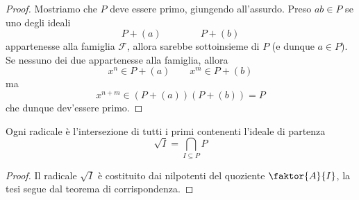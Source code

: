 \begin{multicols}{2}
\begin{proof}
	Mostriamo che $ P $ deve essere primo, giungendo all'assurdo. Preso $ ab \in P $ se uno degli ideali 
	\[ P + (a) \qquad \qquad P + (b) \]
	appartenesse alla famiglia $ \mathcal{F} $, allora sarebbe sottoinsieme di $ P $ (e dunque $ a \in P $). Se nessuno dei due appartenesse alla famiglia, allora
	\[ x^n \in P + (a) \qquad x^m \in P + (b) \]
	ma
	\[ x^{n + m} \in (P + (a))(P + (b)) = P \]
	che dunque dev'essere primo.
\end{proof}
\begin{theorem}
	Ogni radicale è l'intersezione di tutti i primi contenenti l'ideale di partenza
	$$  \sqrt{I} = \bigcap_{I \subseteq P} P  $$
\end{theorem}
\begin{proof}
	Il radicale $ \sqrt{I} $ è costituito dai nilpotenti del quoziente $ \faktor{A}{I} $, la tesi segue dal teorema di corrispondenza.
\end{proof}

\end{multicols}

